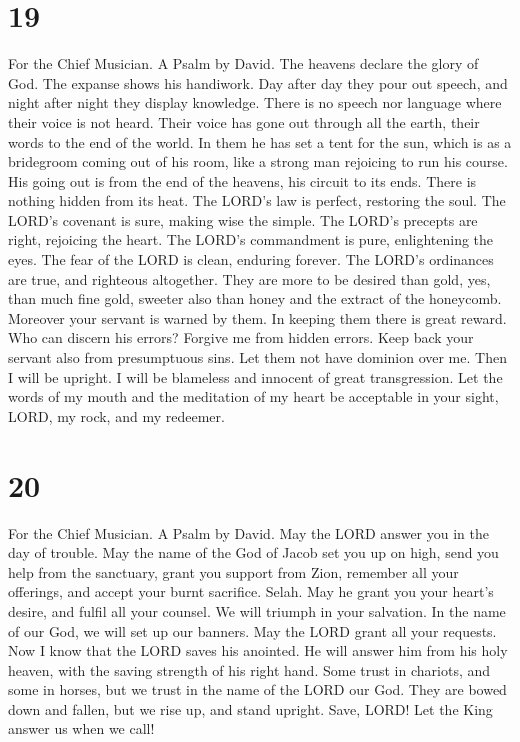 \hypertarget{section-18}{%
\section{19}\label{section-18}}

For the Chief Musician. A Psalm by David.  The heavens
declare the glory of God. The expanse shows his handiwork. 
Day after day they pour out speech, and night after night they display
knowledge.  There is no speech nor language where their
voice is not heard.  Their voice has gone out through all
the earth, their words to the end of the world. In them he has set a
tent for the sun,  which is as a bridegroom coming out of
his room, like a strong man rejoicing to run his course. 
His going out is from the end of the heavens, his circuit to its ends.
There is nothing hidden from its heat.  The LORD's law is
perfect, restoring the soul. The LORD's covenant is sure, making wise
the simple.  The LORD's precepts are right, rejoicing the
heart. The LORD's commandment is pure, enlightening the eyes.
 The fear of the LORD is clean, enduring forever. The LORD's
ordinances are true, and righteous altogether.  They are
more to be desired than gold, yes, than much fine gold, sweeter also
than honey and the extract of the honeycomb.  Moreover your
servant is warned by them. In keeping them there is great reward.
 Who can discern his errors? Forgive me from hidden errors.
 Keep back your servant also from presumptuous sins. Let
them not have dominion over me. Then I will be upright. I will be
blameless and innocent of great transgression.  Let the
words of my mouth and the meditation of my heart be acceptable in your
sight, LORD, my rock, and my redeemer.

\hypertarget{section-19}{%
\section{20}\label{section-19}}

For the Chief Musician. A Psalm by David.  May the LORD
answer you in the day of trouble. May the name of the God of Jacob set
you up on high,  send you help from the sanctuary, grant you
support from Zion,  remember all your offerings, and accept
your burnt sacrifice. Selah.  May he grant you your heart's
desire, and fulfil all your counsel.  We will triumph in
your salvation. In the name of our God, we will set up our banners. May
the LORD grant all your requests.  Now I know that the LORD
saves his anointed. He will answer him from his holy heaven, with the
saving strength of his right hand.  Some trust in chariots,
and some in horses, but we trust in the name of the LORD our God.
 They are bowed down and fallen, but we rise up, and stand
upright.  Save, LORD! Let the King answer us when we call!

